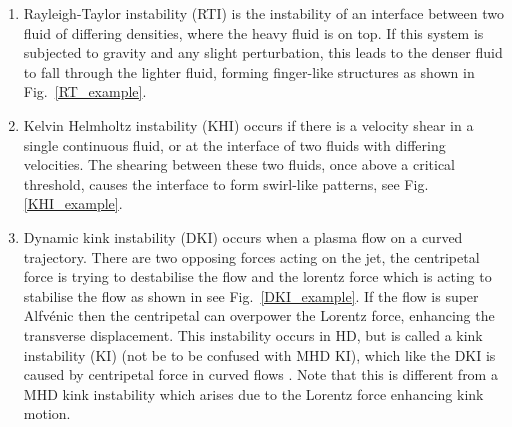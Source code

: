 \documentclass[12pt]{ociamthesis}
\newcommand{\Alfvenic}{Alfv\'{e}nic }
\begin{document}
\begin{enumerate}
    \item Rayleigh-Taylor instability (RTI) is the instability of an interface between two fluid of differing densities, where the heavy fluid is on top. If this system is subjected to gravity and any slight perturbation, this leads to the denser fluid to fall through the lighter fluid, forming finger-like structures as shown in Fig.~\ref{RT_example}.
    \item Kelvin Helmholtz instability (KHI) occurs if there is a velocity shear in a single continuous fluid, or at the interface of two fluids with differing velocities. The shearing between these two fluids, once above a critical threshold, causes the interface to form swirl-like patterns, see Fig.\ref{KHI_example}.    
    \item Dynamic kink instability (DKI) occurs when a plasma flow on a curved trajectory. There are two opposing forces acting on the jet, the centripetal force is trying to destabilise the flow and the lorentz force which is acting to stabilise the flow as shown in see Fig.~\ref{DKI_example}. If the flow is super \Alfvenic then the centripetal can overpower the Lorentz force, enhancing the transverse displacement. This instability occurs in HD, but is called a kink instability (KI) (not be to be confused with MHD KI), which like the DKI is caused by centripetal force in curved flows \citep{Drazin2002ihsbookD}. Note that this is different from a MHD kink instability which arises due to the Lorentz force enhancing kink motion.
\end{enumerate}
\end{document}
